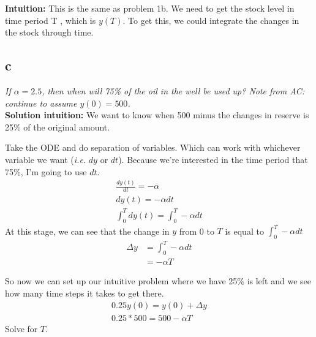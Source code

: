 \documentclass{article}
\begin{document}
\textbf{Intuition:} This is the same as problem 1b. We need to get the stock level in time period T , which is $y(T)$. To get this, we
could integrate the changes in the stock through time. 

\subsection{c}
\textit{If $\alpha = 2.5$, then when will 75\% of the oil in the well be used up? Note from AC: continue to assume $y(0) = 500$.} \\

\textbf{Solution intuition:} We want to know when 500 minus the changes in reserve is 25\% of the original amount. 

Take the ODE and do separation of variables. Which can work with whichever variable we want (\textit{i.e.} $dy$ or $dt$). Because we're interested in the time period that 75\%, I'm going to use $dt$. 
\begin{align}
    \frac{d y(t)}{dt} = - \alpha \\
    d y(t) = - \alpha dt\\
    \int_0^T dy(t) = \int_0^T - \alpha dt 
\end{align}
At this stage, we can see that the change in $y$ from 0 to $T$ is equal to $\int_0^T - \alpha dt $
\begin{align}
    \Delta y &= \int_0^T - \alpha dt\\
    &= - \alpha T
\end{align}

So now we can set up our intuitive problem where we have 25\% is left and we see how many time steps it takes to get there. 
\begin{align*}
    0.25 y(0) = y(0) + \Delta y\\
    0.25 * 500 = 500 - \alpha T
\end{align*}
Solve for $T$. 
\end{document}
